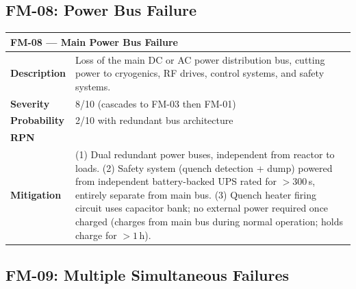 \documentclass[11pt,a4paper]{article}
\newcommand{\Smed}[1]{\cellcolor{risk-medium!40}{#1}}
\begin{document}
\subsection{FM-08: Power Bus Failure}

\begin{longtable}{p{0.25\tw}p{0.65\tw}}
\toprule
\multicolumn{2}{l}{\textbf{FM-08 --- Main Power Bus Failure}} \\
\midrule
\endhead
\textbf{Description} &
  Loss of the main DC or AC power distribution bus, cutting power
  to cryogenics, RF drives, control systems, and safety systems. \\[4pt]
\textbf{Severity} & 8/10 (cascades to FM-03 then FM-01) \\[4pt]
\textbf{Probability} & 2/10 with redundant bus architecture \\[4pt]
\textbf{RPN} & \Smed{$8 \times 2 \times (11-9) = 32$} \\[4pt]
\textbf{Mitigation} &
  (1) Dual redundant power buses, independent from reactor to loads.
  (2) Safety system (quench detection + dump) powered from independent
  battery-backed UPS rated for $> 300$\,s, entirely separate from
  main bus. (3) Quench heater firing circuit uses capacitor bank;
  no external power required once charged (charges from main bus
  during normal operation; holds charge for $> 1$\,h). \\
\bottomrule
\end{longtable}

\subsection{FM-09: Multiple Simultaneous Failures}
\end{document}
